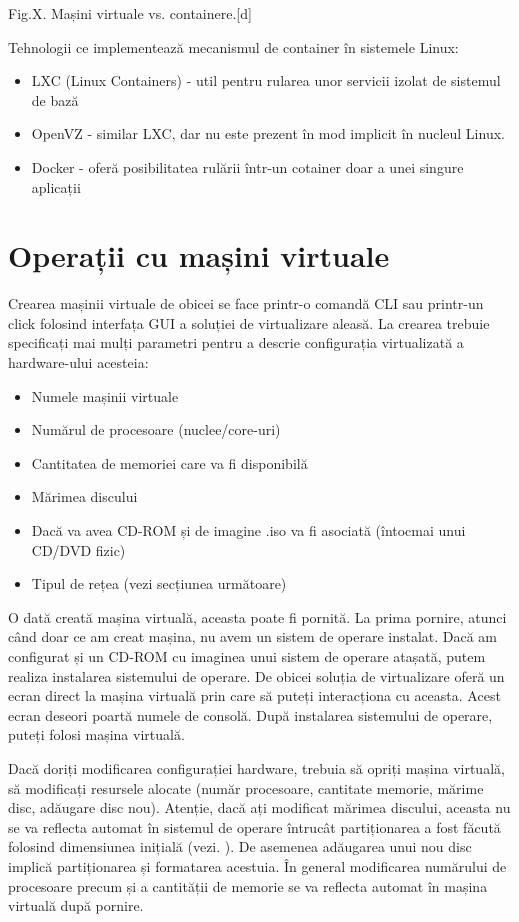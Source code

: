Fig.X. Mașini virtuale vs. containere.[d]

Tehnologii ce implementează mecanismul de container în sistemele Linux:

\begin{itemize}
	\item LXC (Linux Containers) - util pentru rularea unor servicii izolat
		de sistemul de bază
	\item OpenVZ - similar LXC, dar nu este prezent în mod implicit în
		nucleul Linux.
	\item Docker - oferă posibilitatea rulării într-un cotainer doar a unei
		singure aplicații
\end{itemize}

\section{Operații cu mașini virtuale}
\label{sec:vm-ops}

Crearea mașinii virtuale de obicei se face printr-o comandă CLI sau printr-un
click folosind interfața GUI a soluției de virtualizare aleasă. La crearea
trebuie specificați mai mulți parametri pentru a descrie configurația
virtualizată a hardware-ului acesteia:

\begin{itemize}
	\item Numele mașinii virtuale
	\item Numărul de procesoare (nuclee/core-uri)
	\item Cantitatea de memoriei care va fi disponibilă
	\item Mărimea discului
	\item Dacă va avea CD-ROM și de imagine .iso va fi asociată (întocmai
		unui CD/DVD fizic)
	\item Tipul de rețea (vezi secțiunea următoare)
\end{itemize}

O dată creată mașina virtuală, aceasta poate fi pornită. La prima pornire,
atunci când doar ce am creat mașina, nu avem un sistem de operare instalat. Dacă
am configurat și un CD-ROM cu imaginea unui sistem de operare atașată, putem
realiza instalarea sistemului de operare. De obicei soluția de virtualizare
oferă un ecran direct la mașina virtuală prin care să puteți interacționa cu
aceasta. Acest ecran deseori poartă numele de consolă. După instalarea
sistemului de operare, puteți folosi mașina virtuală.

Dacă doriți modificarea configurației hardware, trebuia să opriți mașina
virtuală, să modificați resursele alocate (număr procesoare, cantitate memorie,
mărime disc, adăugare disc nou). Atenție, dacă ați modificat mărimea discului,
aceasta nu se va reflecta automat în sistemul de operare întrucât partiționarea
a fost făcută folosind dimensiunea inițială (vezi.
). De asemenea adăugarea unui nou disc
implică partiționarea și formatarea acestuia. În general modificarea numărului
de procesoare precum și a cantității de memorie se va reflecta automat în mașina
virtuală după pornire.

